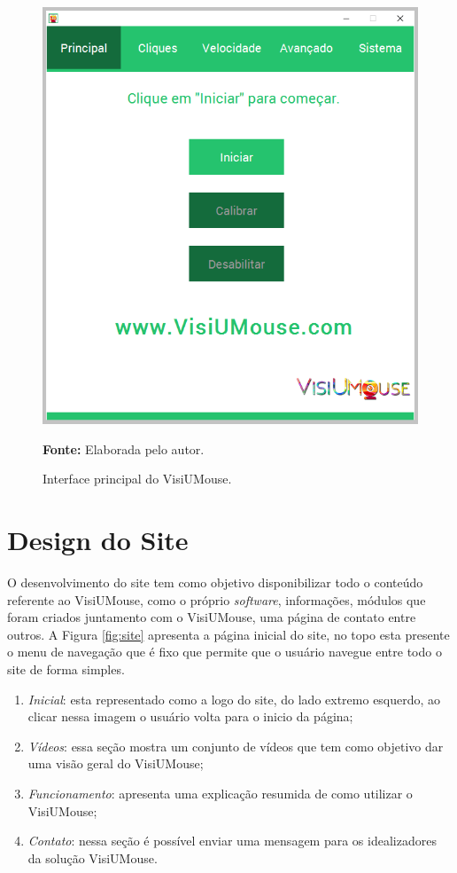 \begin{figure}[htbp]
\caption{Interface principal do VisiUMouse.} 
\centering \includegraphics[scale=.5]{img/visiumouse-tela-principal-v216.png}

{\fontsize{11}{11}\selectfont \textbf{Fonte:} Elaborada pelo autor.}
\label{fig:interface-tecnologia}
\end{figure}

\section{Design do Site}\label{Sub:site}

O desenvolvimento do site tem como objetivo disponibilizar todo o conteúdo referente ao VisiUMouse, como o próprio \textit{software}, informações, módulos que foram criados juntamento com o VisiUMouse, uma página de contato entre outros. A Figura \ref{fig:site} apresenta a página inicial do site, no topo esta presente o menu de navegação que é fixo que permite que o usuário navegue entre todo o site de forma simples.

\begin{enumerate}
\item \textit{Inicial}: esta representado como a logo do site, do lado extremo esquerdo, ao clicar nessa imagem o usuário volta para o inicio da página;

\item \textit{Vídeos}: essa seção mostra um conjunto de vídeos que tem como objetivo dar uma visão geral do VisiUMouse;

\item \textit{Funcionamento}: apresenta uma explicação resumida de como utilizar o VisiUMouse;

\item \textit{Contato}: nessa seção é possível enviar uma mensagem para os idealizadores da solução VisiUMouse.
\end{enumerate}


